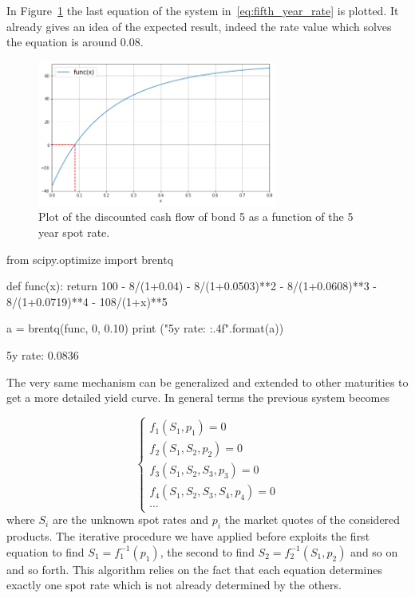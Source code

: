 In Figure~\ref{fig:fifth_year_rate} the last equation of the system in~\ref{eq:fifth_year_rate} is plotted. It already gives an idea of the expected result, indeed the rate value which solves the equation is around 0.08.

\begin{figure}[htb]
  \centering
  \includegraphics[width=0.7\textwidth]{figures/bond_5_plot.png}
  \caption{Plot of the discounted cash flow of bond 5 as a function of the 5 year spot rate.}
  \label{fig:fifth_year_rate}
\end{figure}

\begin{ipython}
from scipy.optimize import brentq

def func(x):
    return 100 - 8/(1+0.04) - 8/(1+0.0503)**2 - 8/(1+0.0608)**3
               - 8/(1+0.0719)**4 - 108/(1+x)**5
               
a = brentq(func, 0, 0.10)
print ("5y rate: {:.4f}".format(a))
\end{ipython}
\begin{ioutput}
5y rate: 0.0836
\end{ioutput}

The very same mechanism can be generalized and extended to other maturities to get a more detailed yield curve. In general terms the previous system becomes

\begin{equation}
\begin{cases}
f_1(S_1, p_1) = 0 \\
f_2(S_1, S_2, p_2) = 0 \\
f_3(S_1, S_2, S_3, p_3) = 0 \\
f_4(S_1, S_2, S_3, S_4, p_4) = 0 \\
\cdots
\end{cases}
\end{equation}
where $S_i$ are the unknown spot rates and $p_i$ the market quotes of the considered products. The iterative procedure we have applied before exploits the first equation to find $S_1 = f_1^{-1}(p_1)$, the second to find $S_2 = f_2^{-1}(S_1, p_2)$ and so on and so forth. This algorithm relies on the fact that each equation determines exactly one spot rate which is not already determined by the others.

